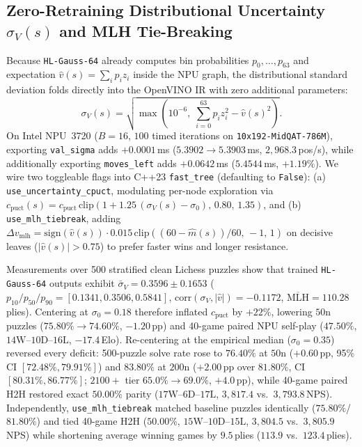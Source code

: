 \documentclass[10pt,twocolumn]{article}
\begin{document}
\subsection{Zero-Retraining Distributional Uncertainty $\sigma_V(s)$ and MLH Tie-Breaking}
\label{sec:uncertainty_mlh}
Because \texttt{HL-Gauss-64} already computes bin probabilities $p_0,\dots,p_{63}$ and expectation $\hat{v}(s)=\sum_i p_i z_i$ inside the NPU graph, the distributional standard deviation folds directly into the OpenVINO IR with zero additional parameters:
\begin{equation}
  \sigma_V(s) = \sqrt{\max\!\left(10^{-6},\; \sum_{i=0}^{63} p_i z_i^2 - \hat{v}(s)^2\right)}.
  \label{eq:val_sigma}
\end{equation}
On Intel NPU~3720 ($B=16$, $100$ timed iterations on \texttt{10x192-MidQAT-786M}), exporting \texttt{val\_sigma} adds $+0.0001$\,ms ($5.3902 \to 5.3903$\,ms, $2{,}968.3$\,pos/s), while additionally exporting \texttt{moves\_left} adds $+0.0642$\,ms ($5.4544$\,ms, $+1.19\%$). We wire two toggleable flags into C++23 \texttt{fast\_tree} (defaulting to \texttt{False}): (a) \texttt{use\_uncertainty\_cpuct}, modulating per-node exploration via $c_{\mathrm{puct}}(s) = c_{\mathrm{puct}}\,\mathrm{clip}(1 + 1.25\,(\sigma_V(s) - \sigma_0),\,0.80,\,1.35)$, and (b) \texttt{use\_mlh\_tiebreak}, adding $\Delta v_{\mathrm{mlh}} = \mathrm{sign}(\hat{v}(s))\cdot 0.015\,\mathrm{clip}((60-\hat{m}(s))/60,\,-1,\,1)$ on decisive leaves ($|\hat{v}(s)| > 0.75$) to prefer faster wins and longer resistance.

Measurements over 500 stratified clean Lichess puzzles show that trained \texttt{HL-Gauss-64} outputs exhibit $\bar{\sigma}_V = 0.3596 \pm 0.1653$ ($p_{10}/p_{50}/p_{90} = [0.1341, 0.3506, 0.5841]$, $\mathrm{corr}(\sigma_V, |\hat{v}|) = -0.1172$, $\overline{\mathrm{MLH}} = 110.28$\,plies). Centering at $\sigma_0 = 0.18$ therefore inflated $c_{\mathrm{puct}}$ by $+22\%$, lowering $50\text{n}$ puzzles ($75.80\% \to 74.60\%$, $-1.20$\,pp) and 40-game paired NPU self-play ($47.50\%$, $14\text{W}\text{--}10\text{D}\text{--}16\text{L}$, $-17.4$\,Elo). Re-centering at the empirical median ($\sigma_0 = 0.35$) reversed every deficit: 500-puzzle solve rate rose to $76.40\%$ at $50\text{n}$ ($+0.60$\,pp, 95\% CI $[72.48\%, 79.91\%]$) and $83.80\%$ at $200\text{n}$ ($+2.00$\,pp over $81.80\%$, CI $[80.31\%, 86.77\%]$; $2100+$ tier $65.0\% \to 69.0\%$, $+4.0$\,pp), while 40-game paired H2H restored exact $50.00\%$ parity ($17\text{W}\text{--}6\text{D}\text{--}17\text{L}$, $3{,}817.4$ vs.\ $3{,}793.8$\,NPS). Independently, \texttt{use\_mlh\_tiebreak} matched baseline puzzles identically ($75.80\%$/$81.80\%$) and tied 40-game H2H ($50.00\%$, $15\text{W}\text{--}10\text{D}\text{--}15\text{L}$, $3{,}804.5$ vs.\ $3{,}805.9$\,NPS) while shortening average winning games by $9.5$\,plies ($113.9$ vs.\ $123.4$\,plies).
\end{document}
